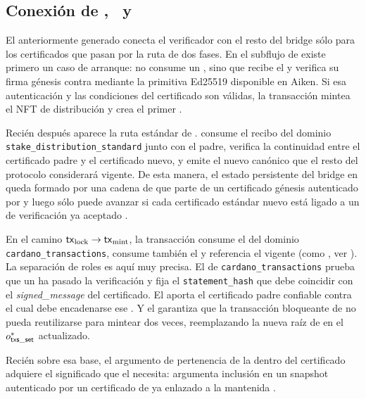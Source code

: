 \subsection{Conexión de \texorpdfstring{\UTxOs, \StakeDistTx\ y \MintTx}{UTxOs, StakeDistTx y MintTx}}
\label{subsec:mithril-a-cardano-conexion-de-utxos-stakedisttx-y-minttx}

El \ProofReceipt anteriormente generado conecta el verificador \STM con el resto del bridge sólo para los certificados que pasan por la ruta de dos fases. En el subflujo de \StakeDistribution existe primero un caso de arranque: \StakeDistributionGenesisTxTemplate no consume un \ProofReceipt, sino que recibe el \GenesisCertificate y verifica su firma génesis \GenesisSignature contra \GenesisVerificationKey mediante la primitiva Ed25519 disponible en Aiken. Si esa autenticación y las condiciones del certificado son válidas, la transacción mintea el NFT de distribución y crea el primer \StakeDistributionUTxO.

Recién después aparece la ruta estándar de \StakeDistribution. \StakeDistributionStandardTxTemplate consume el recibo del dominio \texttt{stake\_distribution\_standard} junto con el \StakeDistributionUTxO padre, verifica la continuidad entre el certificado padre y el certificado nuevo, y emite el nuevo \StakeDistributionUTxO canónico que el resto del protocolo considerará vigente. De esta manera, el estado persistente del bridge en \ChainB queda formado por una cadena de \UTxOs que parte de un certificado génesis autenticado por \GenesisVerificationKey y luego sólo puede avanzar si cada certificado estándar nuevo está ligado a un \ProofReceipt de verificación \STM ya aceptado \Onchain.

En el camino $\mathsf{tx}_{\mathrm{lock}} \rightarrow \mathsf{tx}_{\mathrm{mint}}$, la transacción \BridgeMintTxTemplate consume el \ProofReceipt del dominio \texttt{cardano\_transactions}, consume también el \TxsUpdaterUTxO y referencia el \StakeDistributionUTxO vigente (como \ReferenceInput, ver  \cite{CIP0031}). La separación de roles es aquí muy precisa. El \ProofReceipt de \texttt{cardano\_transactions} prueba que un \TransactionSnapshotCertificate ha pasado la verificación \STM y fija el \texttt{statement\_hash} que debe coincidir con el \textit{signed\_message} del certificado. El \StakeDistributionUTxO aporta el certificado padre confiable contra el cual debe encadenarse ese \TransactionSnapshotCertificate. Y el \TxsUpdaterMintingValidator garantiza que la transacción bloqueante de \ChainA no pueda reutilizarse para mintear dos veces, reemplazando la nueva raíz de \SMT en el $o_{\mathsf{txs\_set}}^*$ actualizado.

Recién sobre esa base, el argumento \Groth de pertenencia de la \LockTx dentro del \TransactionSnapshot certificado adquiere el significado que el \zkBridge necesita: argumenta inclusión en un snapshot autenticado por un certificado de \Mithril ya enlazado a la \CertificateChain mantenida \Onchain.
